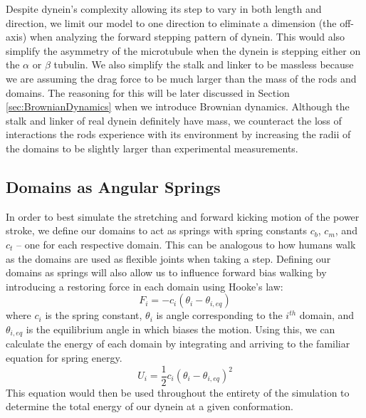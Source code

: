 Despite dynein's complexity allowing its step to vary in both length and direction, we limit our model to one direction to eliminate a dimension (the off-axis) when analyzing the forward stepping pattern of dynein. This would also simplify the asymmetry of the microtubule when the dynein is stepping either on the $\alpha$ or $\beta$ tubulin. We also simplify the stalk and linker to be massless because we are assuming the drag force to be much larger than the mass of the rods and domains. The reasoning for this will be later discussed in Section \ref{sec:BrownianDynamics} when we introduce Brownian dynamics. Although the stalk and linker of real dynein definitely have mass, we counteract the loss of interactions the rods experience with its environment by increasing the radii of the domains to be slightly larger than experimental measurements.

\subsection{Domains as Angular Springs}
In order to best simulate the stretching and forward kicking motion of the power stroke, we define our domains to act as springs with spring constants $c_b$, $c_m$, and $c_t$ -- one for each respective domain. This can be analogous to how humans walk as the domains are used as flexible joints when taking a step. Defining our domains as springs will also allow us to influence forward bias walking by introducing a restoring force in each domain using Hooke's law: 
\begin{equation}
    F_i=-c_i(\theta_i-\theta_{i,eq})
\end{equation}
where $c_i$ is the spring constant, $\theta_i$ is angle corresponding to the $i^{th}$ domain, and $\theta_{i,eq}$ is the equilibrium angle in which biases the motion. Using this, we can calculate the energy of each domain by integrating and arriving to the familiar equation for spring energy.
\begin{equation} \label{eq:energy}
    U_i=\frac{1}{2}c_i(\theta_i-\theta_{i,eq})^2
\end{equation}
This equation would then be used throughout the entirety of the simulation to determine the total energy of our dynein at a given conformation. 


